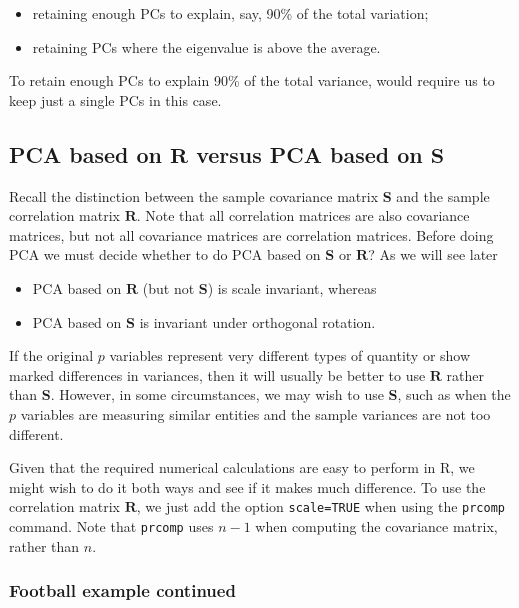 \documentclass[
]{book}
\providecommand{\tightlist}{%
  \setlength{\itemsep}{0pt}\setlength{\parskip}{0pt}}
\theoremstyle{definition}
\theoremstyle{definition}
\theoremstyle{definition}
\theoremstyle{definition}
\theoremstyle{remark}
\begin{document}
\begin{itemize}
\tightlist
\item
  retaining enough PCs to explain, say, 90\% of the total variation;
\item
  retaining PCs where the eigenvalue is above the average.
\end{itemize}

To retain enough PCs to explain 90\% of the total variance, would require us to keep just a single PCs in this case.

\hypertarget{pcawithR}{%
\subsection{\texorpdfstring{PCA based on \(\mathbf R\) versus PCA based on \(\mathbf S\)}{PCA based on \textbackslash mathbf R versus PCA based on \textbackslash mathbf S}}\label{pcawithR}}

Recall the distinction between the sample covariance matrix \(\mathbf S\) and the sample correlation matrix \(\mathbf R\).
Note that all correlation matrices are also covariance matrices, but not all covariance matrices are correlation matrices.
Before doing PCA we must decide whether to do PCA based on \(\mathbf S\) or \(\mathbf R\)? As we will see later

\begin{itemize}
\tightlist
\item
  PCA based on \(\mathbf R\) (but not \(\mathbf S\)) is scale invariant, whereas
\item
  PCA based on \(\mathbf S\) is invariant under orthogonal rotation.
\end{itemize}

If the original \(p\) variables represent very different types of quantity or show marked differences in variances, then it will usually be better to use \(\mathbf R\) rather than \(\mathbf S\). However, in some circumstances, we may wish to use \(\mathbf S\), such as when the \(p\) variables are measuring similar entities and the sample variances are not too different.

Given that the required numerical calculations are easy to perform in R, we might wish to do it both ways and see if it makes much difference. To use the correlation matrix \(\mathbf R\), we just add the option \texttt{scale=TRUE} when using the \texttt{prcomp} command. Note that \texttt{prcomp} uses \(n-1\) when computing the covariance matrix, rather than \(n\).

\hypertarget{football-example-continued}{%
\subsubsection{Football example continued}\label{football-example-continued}}
\end{document}
